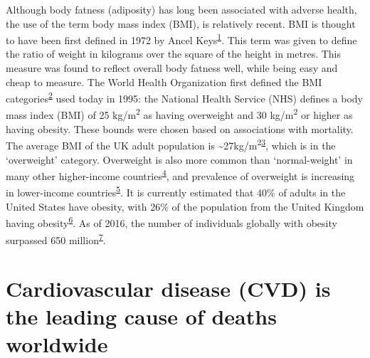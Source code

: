 \documentclass[11pt,twoside]{bristolthesis}
\begin{document}
Although body fatness (adiposity) has long been associated with adverse health, the use of the term body mass index (BMI), is relatively recent. BMI is thought to have been first defined in 1972 by Ancel Keys\textsuperscript{\protect\hyperlink{ref-Blackburn2014}{1}}. This term was given to define the ratio of weight in kilograms over the square of the height in metres. This measure was found to reflect overall body fatness well, while being easy and cheap to measure. The World Health Organization first defined the BMI categories\textsuperscript{\protect\hyperlink{ref-WHO1995}{2}} used today in 1995: the National Health Service (NHS) defines a body mass index (BMI) of 25 kg/m\textsuperscript{2} as having overweight and 30 kg/m\textsuperscript{2} or higher as having obesity. These bounds were chosen based on associations with mortality. The average BMI of the UK adult population is \textasciitilde27kg/m\textsuperscript{2}\textsuperscript{\protect\hyperlink{ref-Wade2018}{3}}, which is in the `overweight' category. Overweight is also more common than `normal-weight' in many other higher-income countries\textsuperscript{\protect\hyperlink{ref-NCD-RisC2016}{4}}, and prevalence of overweight is increasing in lower-income countries\textsuperscript{\protect\hyperlink{ref-Templin2019}{5}}. It is currently estimated that 40\% of adults in the United States have obesity, with 26\% of the population from the United Kingdom having obesity\textsuperscript{\protect\hyperlink{ref-Bluher2019}{6}}. As of 2016, the number of individuals globally with obesity surpassed 650 million\textsuperscript{\protect\hyperlink{ref-TheLancetPublicHealth2018}{7}}.

\hypertarget{CVD-stats}{%
\section{Cardiovascular disease (CVD) is the leading cause of deaths worldwide}\label{CVD-stats}}
\end{document}
